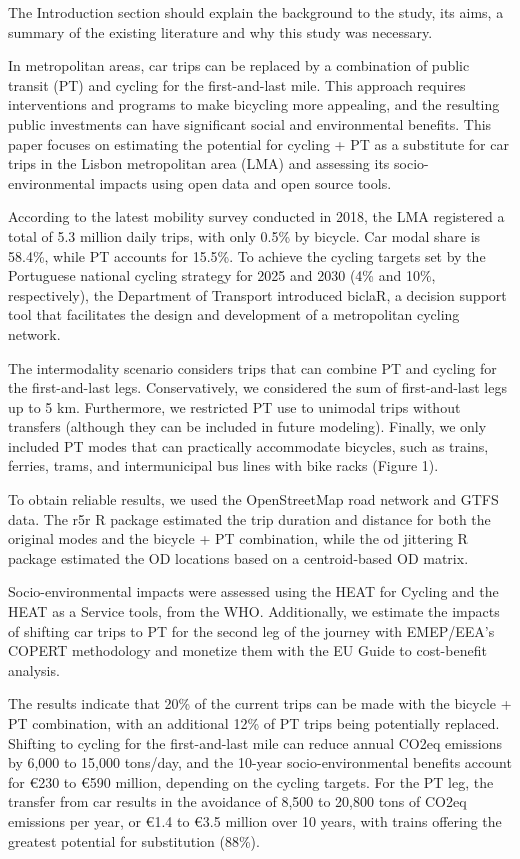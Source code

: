 \documentclass[sn-apa,referee,pdflatex]{sn-jnl}
\begin{document}
The Introduction section should explain the background to the study, its
aims, a summary of the existing literature and why this study was
necessary.

In metropolitan areas, car trips can be replaced by a combination of
public transit (PT) and cycling for the first-and-last mile. This
approach requires interventions and programs to make bicycling more
appealing, and the resulting public investments can have significant
social and environmental benefits. This paper focuses on estimating the
potential for cycling + PT as a substitute for car trips in the Lisbon
metropolitan area (LMA) and assessing its socio-environmental impacts
using open data and open source tools.

According to the latest mobility survey conducted in 2018, the LMA
registered a total of 5.3 million daily trips, with only 0.5\% by
bicycle. Car modal share is 58.4\%, while PT accounts for 15.5\%. To
achieve the cycling targets set by the Portuguese national cycling
strategy for 2025 and 2030 (4\% and 10\%, respectively), the Department
of Transport introduced biclaR, a decision support tool that facilitates
the design and development of a metropolitan cycling network.

The intermodality scenario considers trips that can combine PT and
cycling for the first-and-last legs. Conservatively, we considered the
sum of first-and-last legs up to 5 km. Furthermore, we restricted PT use
to unimodal trips without transfers (although they can be included in
future modeling). Finally, we only included PT modes that can
practically accommodate bicycles, such as trains, ferries, trams, and
intermunicipal bus lines with bike racks (Figure 1).

To obtain reliable results, we used the OpenStreetMap road network and
GTFS data. The r5r R package estimated the trip duration and distance
for both the original modes and the bicycle + PT combination, while the
od jittering R package estimated the OD locations based on a
centroid-based OD matrix.

Socio-environmental impacts were assessed using the HEAT for Cycling and
the HEAT as a Service tools, from the WHO. Additionally, we estimate the
impacts of shifting car trips to PT for the second leg of the journey
with EMEP/EEA's COPERT methodology and monetize them with the EU Guide
to cost-benefit analysis.

The results indicate that 20\% of the current trips can be made with the
bicycle + PT combination, with an additional 12\% of PT trips being
potentially replaced. Shifting to cycling for the first-and-last mile
can reduce annual CO2eq emissions by 6,000 to 15,000 tons/day, and the
10-year socio-environmental benefits account for €230 to €590 million,
depending on the cycling targets. For the PT leg, the transfer from car
results in the avoidance of 8,500 to 20,800 tons of CO2eq emissions per
year, or €1.4 to €3.5 million over 10 years, with trains offering the
greatest potential for substitution (88\%).
\end{document}
